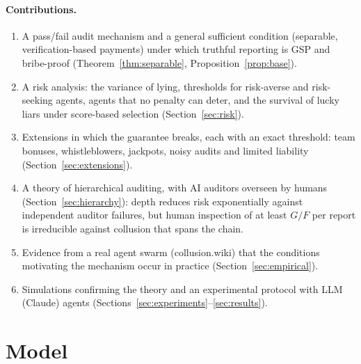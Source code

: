 \documentclass[11pt]{article}
\theoremstyle{definition}
\theoremstyle{remark}
\newcommand{\1}{\mathbf{1}}
\begin{document}
\paragraph{Contributions.}
\begin{enumerate}
    \item A pass/fail audit mechanism and a general sufficient condition (separable,
    verification-based payments) under which truthful reporting is GSP and bribe-proof
    (Theorem~\ref{thm:separable}, Proposition~\ref{prop:base}).
    \item A risk analysis: the variance of lying, thresholds for risk-averse and
    risk-seeking agents, agents that no penalty can deter, and the survival of lucky
    liars under score-based selection (Section~\ref{sec:risk}).
    \item Extensions in which the guarantee breaks, each with an exact threshold: team
    bonuses, whistleblowers, jackpots, noisy audits and limited liability
    (Section~\ref{sec:extensions}).
    \item A theory of hierarchical auditing, with AI auditors overseen by humans
    (Section~\ref{sec:hierarchy}): depth reduces risk exponentially against independent
    auditor failures, but human inspection of at least $G/F$ per report is irreducible
    against collusion that spans the chain.
    \item Evidence from a real agent swarm (collusion.wiki) that the conditions motivating
    the mechanism occur in practice (Section~\ref{sec:empirical}).
    \item Simulations confirming the theory and an experimental protocol with LLM
    (Claude) agents (Sections~\ref{sec:experiments}--\ref{sec:results}).
\end{enumerate}

\section{Model}
\label{sec:model}
\end{document}
